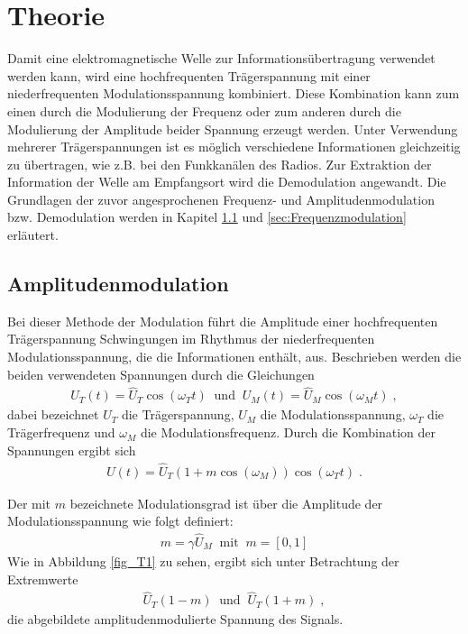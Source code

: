 \section{Theorie}
\label{sec:Theorie}

Damit eine elektromagnetische Welle zur Informationsübertragung verwendet werden kann, wird eine hochfrequenten Trägerspannung mit einer niederfrequenten Modulationsspannung kombiniert. Diese Kombination kann zum einen durch die Modulierung der Frequenz oder zum anderen durch die Modulierung der Amplitude beider Spannung erzeugt werden. Unter Verwendung mehrerer Trägerspannungen ist es möglich verschiedene Informationen gleichzeitig zu übertragen, wie z.B. bei den Funkkanälen des Radios. Zur Extraktion der Information der Welle am Empfangsort wird die Demodulation angewandt. Die Grundlagen der zuvor angesprochenen Frequenz- und Amplitudenmodulation bzw. Demodulation werden in Kapitel \ref{sec:Amplitudenmodulation} und \ref{sec:Frequenzmodulation} erläutert.

\subsection{Amplitudenmodulation}
\label{sec:Amplitudenmodulation}

Bei dieser Methode der Modulation führt die Amplitude einer hochfrequenten Trägerspannung Schwingungen im Rhythmus der niederfrequenten Modulationsspannung, die die Informationen enthält, aus. Beschrieben werden die beiden verwendeten Spannungen durch die Gleichungen 
\begin{align}
	U_T(t)=\hat{U}_T\cos{(\omega_Tt)} \;\; \text{und} \;\; U_M(t)=\hat{U}_M\cos{(\omega_Mt)}\; ,
\end{align}
dabei bezeichnet $U_T$ die Trägerspannung, $U_M$ die Modulationsspannung, $\omega_T$ die Trägerfrequenz und $\omega_M$ die Modulationsfrequenz. Durch die Kombination der Spannungen ergibt sich
\begin{align}
	U(t)=\hat{U}_T(1+m\cos{(\omega_M)})\cos{(\omega_Tt)}\;.
	\label{eq:1}
\end{align}

Der mit $m$ bezeichnete Modulationsgrad ist über die Amplitude der Modulationsspannung wie folgt definiert:
\begin{align}
	m=\gamma\hat{U}_M \;\; \text{mit} \;\; m= [0,1]
\end{align}
Wie in Abbildung \ref{fig_T1} zu sehen, ergibt sich unter Betrachtung der Extremwerte 
\begin{align}
	\hat{U}_T(1-m) \;\; \text{und} \;\; \hat{U}_T(1+m)\;,
\end{align}
die abgebildete amplitudenmodulierte Spannung des Signals. 

